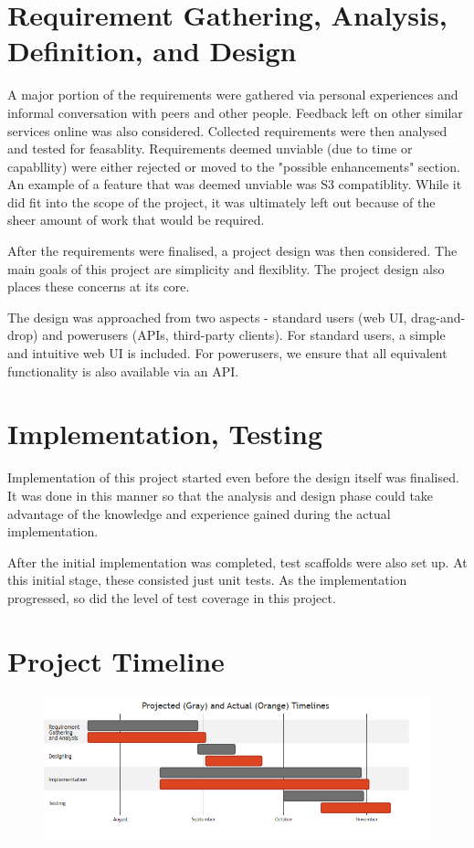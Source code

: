 \documentclass[12pt,a4paper]{report}
\begin{document}
\section{Requirement Gathering, Analysis, Definition, and Design}\label{sec:req}
A major portion of the requirements were gathered via personal experiences and informal conversation with peers and other people.
Feedback left on other similar services online was also considered.
Collected requirements were then analysed and tested for feasablity.
Requirements deemed unviable (due to time or capabllity) were either rejected or moved to the "possible enhancements" section.
An example of a feature that was deemed unviable was S3 compatiblity.
While it did fit into the scope of the project, it was ultimately left out because of the sheer amount of work that would be required.

After the requirements were finalised, a project design was then considered.
The main goals of this project are simplicity and flexiblity.
The project design also places these concerns at its core.

The design was approached from two aspects - standard users (web UI, drag-and-drop) and powerusers (APIs, third-party clients).
For standard users, a simple and intuitive web UI is included.
For powerusers, we ensure that all equivalent functionality is also available via an API.

\section{Implementation, Testing}\label{sec:impl}
Implementation of this project started even before the design itself was finalised.
It was done in this manner so that the analysis and design phase could take advantage of the knowledge and experience gained during the actual implementation.

After the initial implementation was completed, test scaffolds were also set up.
At this initial stage, these consisted just unit tests.
As the implementation progressed, so did the level of test coverage in this project.

\section{Project Timeline}\label{sec:gantt}
\begin{figure}[H]
	\includegraphics[width=\textwidth]{gantt.png}
\end{figure}
\end{document}
